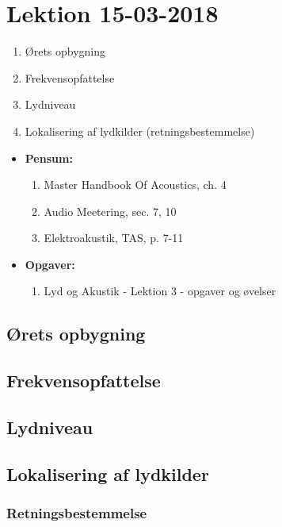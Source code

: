 \section{Lektion 15-03-2018}

\begin{enumerate}
	\item Ørets opbygning
	\item Frekvensopfattelse
	\item Lydniveau
	\item Lokalisering af lydkilder (retningsbestemmelse)
\end{enumerate}

\begin{mdframed}[style=exampledefault]
	\begin{itemize}
		\item \textbf{Pensum:} 
		\begin{enumerate}
			\item Master Handbook Of Acoustics, ch. 4
			\item Audio Meetering, sec. 7, 10
			\item Elektroakustik, TAS,  p. 7-11
		\end{enumerate}
		\item \textbf{Opgaver:} 
		\begin{enumerate}
			\item Lyd og Akustik - Lektion 3 - opgaver og øvelser
		\end{enumerate}
	\end{itemize}
\end{mdframed}
\subsection{Ørets opbygning}
\subsection{Frekvensopfattelse}
\subsection{Lydniveau}
\subsection{Lokalisering af lydkilder}
\subsubsection{Retningsbestemmelse}